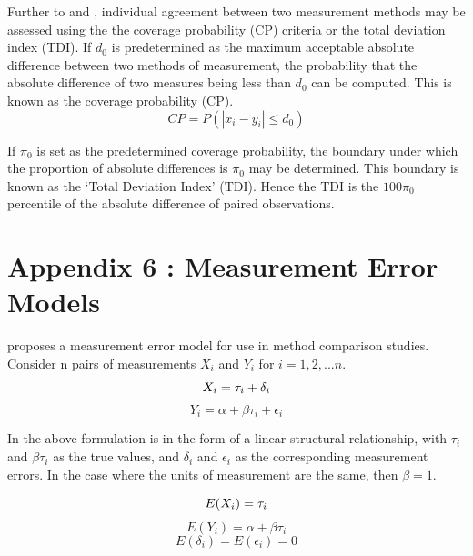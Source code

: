 \documentclass[12pt, a4paper]{report}
\theoremstyle{plain}
\theoremstyle{definition}
\theoremstyle{remark}
\begin{document}
Further to  \citet{lin2000} and \citet{lin2002}, individual agreement between two measurement methods may be
assessed using the the coverage probability (CP) criteria or the total deviation index (TDI). If $d_{0}$ is predetermined as the maximum acceptable absolute difference between two methods of measurement, the probability that the absolute difference of two measures being less than $d_{0}$ can be computed. This is known as the coverage probability (CP).
\begin{equation}
CP = P(|x_{i} - y_{i}| \leq d_{0})
\end{equation}

If $\pi_{0}$ is set as the predetermined coverage probability, the
boundary under which the proportion of absolute differences is
$\pi_{0}$ may be determined. This boundary is known as the `Total Deviation Index' (TDI). Hence the TDI is the $100\pi_{0}$
percentile of the absolute difference of paired observations.


\section{Appendix 6 : Measurement Error Models}

\citet{DunnSEME} proposes a measurement error model for use in
method comparison studies. Consider n pairs of measurements
$X_{i}$ and $Y_{i}$ for $i=1,2,...n$.
\begin{equation}
X_{i} = \tau_{i}+\delta_{i}\\
\end{equation}
\begin{equation}
Y_{i} = \alpha +\beta\tau_{i}+\epsilon_{i} \nonumber
\end{equation}

In the above formulation is in the form of a linear structural
relationship, with $\tau_{i}$ and $\beta\tau_{i}$ as the true
values, and $\delta_{i}$ and $\epsilon_{i}$ as the corresponding
measurement errors. In the case where the units of measurement are
the same, then $\beta =1$.

\begin{equation}
E(X_{i}) = \tau_{i}\\
\end{equation}
\begin{equation}
E(Y_{i}) = \alpha +\beta\tau_{i} \nonumber
\end{equation}
\begin{equation}
E(\delta_{i}) = E(\epsilon_{i}) = 0 \nonumber
\end{equation}
\end{document}
